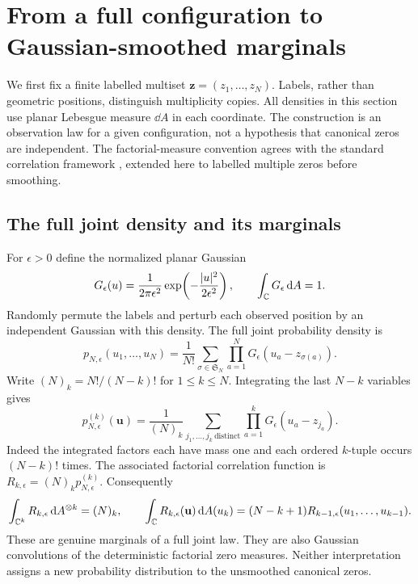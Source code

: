 \section{From a full configuration to Gaussian-smoothed marginals}\label{sec:gaussian}

We first fix a finite labelled multiset $\mathbf z=(z_1,\ldots,z_N)$.
Labels, rather than geometric positions, distinguish multiplicity copies.
All densities in this section use planar Lebesgue measure $\dd A$ in
each coordinate. The construction is an observation law for a given
configuration, not a hypothesis that canonical zeros are independent.
The factorial-measure convention agrees with the standard correlation
framework \cite[Section 2]{Borodin2009DPP}, extended here to labelled
multiple zeros before smoothing.

\subsection{The full joint density and its marginals}

For $\epsilon>0$ define the normalized planar Gaussian
\begin{equation}\label{eq:gaussian}
 G_\epsilon(u)=\frac1{2\pi\epsilon^2}
     \exp\!\left(-\frac{|u|^2}{2\epsilon^2}\right),
 \qquad \int_\mathbb C G_\epsilon\,\mathrm d A=1.
\end{equation}
Randomly permute the labels and perturb each observed position by an
independent Gaussian with this density. The full joint probability
density is
\begin{equation}\label{eq:full-joint}
 p_{N,\epsilon}(u_1,\ldots,u_N)
 =\frac1{N!}\sum_{\sigma\in\mathfrak S_N}
      \prod_{a=1}^N G_\epsilon(u_a-z_{\sigma(a)}).
\end{equation}
Write $(N)_k=N!/(N-k)!$ for $1\le k\le N$.
Integrating the last $N-k$ variables gives
\begin{equation}\label{eq:joint-marginal}
 p^{(k)}_{N,\epsilon}(\mathbf u)
 =\frac1{(N)_k}\sum_{j_1,\ldots,j_k\ \mathrm{distinct}}
            \prod_{a=1}^k G_\epsilon(u_a-z_{j_a}).
\end{equation}
Indeed the integrated factors each have mass one and each ordered
$k$-tuple occurs $(N-k)!$ times. The associated factorial correlation
function is $R_{k,\epsilon}=(N)_k p^{(k)}_{N,\epsilon}$. Consequently
\begin{equation}\label{eq:fixed-N-consistency}
 \int_{\mathbb C^k}R_{k,\epsilon}\,\mathrm d A^{\otimes k}=(N)_k,
 \qquad
 \int_\mathbb C R_{k,\epsilon}(\mathbf u)\,\mathrm d A(u_k)
       =(N-k+1)R_{k-1,\epsilon}(u_1,\ldots,u_{k-1}).
\end{equation}
These are genuine marginals of a full joint law. They are also
Gaussian convolutions of the deterministic factorial zero measures.
Neither interpretation assigns a new probability distribution to the
unsmoothed canonical zeros.

